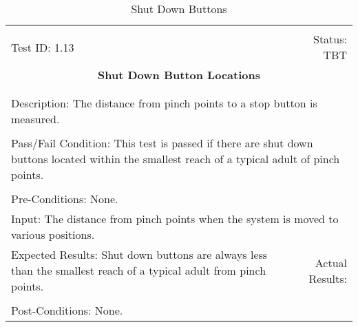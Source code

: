 \documentclass[titlepage]{article}
\begin{document}
\begin{center}%
\begin{table}[h!]
\begin{tabular}{|l r|}\hline&\\[-2mm]
	Test ID: 1.13	&Status: TBT\\[-3mm]
	\multicolumn{2}{|c|}{\textbf{\large{Shut Down Button Locations}}}\\&\\\hline&\\[-3mm]
	\multicolumn{2}{|p{\textwidth}|}{Description: The distance from pinch points to a stop button is measured.}\\[1mm]\hline&\\[-3mm]
	\multicolumn{2}{|p{\textwidth}|}{Pass/Fail Condition: This test is passed if there are shut down buttons located within the smallest reach of a typical adult of pinch points.}\\[1mm]\hline&\\[-3mm]
	\multicolumn{2}{|p{\textwidth}|}{Pre-Conditions: None.}\\[4mm]
	\multicolumn{2}{|p{\textwidth}|}{Input: The distance from pinch points when the system is moved to various positions.}\\[2mm]\hline
	\multicolumn{1}{|p{0.49\textwidth}}{Expected Results: Shut down buttons are always less than the smallest reach of a typical adult from pinch points.}	&\multicolumn{1}{|p{0.45\textwidth}|}{Actual Results:}\\\hline&\\[-3mm]
	\multicolumn{2}{|p{\textwidth}|}{Post-Conditions: None.}\\\hline
\end{tabular}
\caption{Shut Down Buttons}
\end{table}
\end{center}
\end{document}
